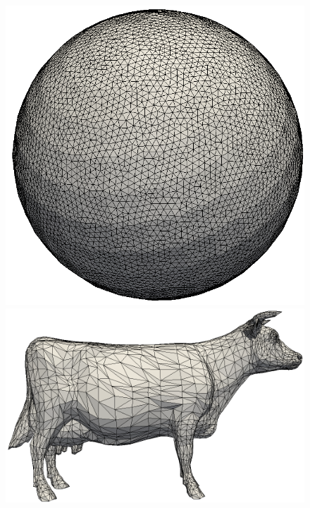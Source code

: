\documentclass[letter,11pt]{article}
\begin{document}
\begin{figure}
\begin{minipage}{0.30\textwidth}
  \end{minipage}
  \begin{minipage}{.30\textwidth}
    \centering
    \includegraphics[width=1\linewidth]{../image/sphere_c.png}
  \end{minipage}
  \begin{minipage}{.30\textwidth}
    \centering
    \includegraphics[width=1\linewidth]{../image/cow_0.png}
  \end{minipage} 
  \begin{minipage}{0.30\textwidth}

\end{minipage}
\end{figure}
\end{document}
